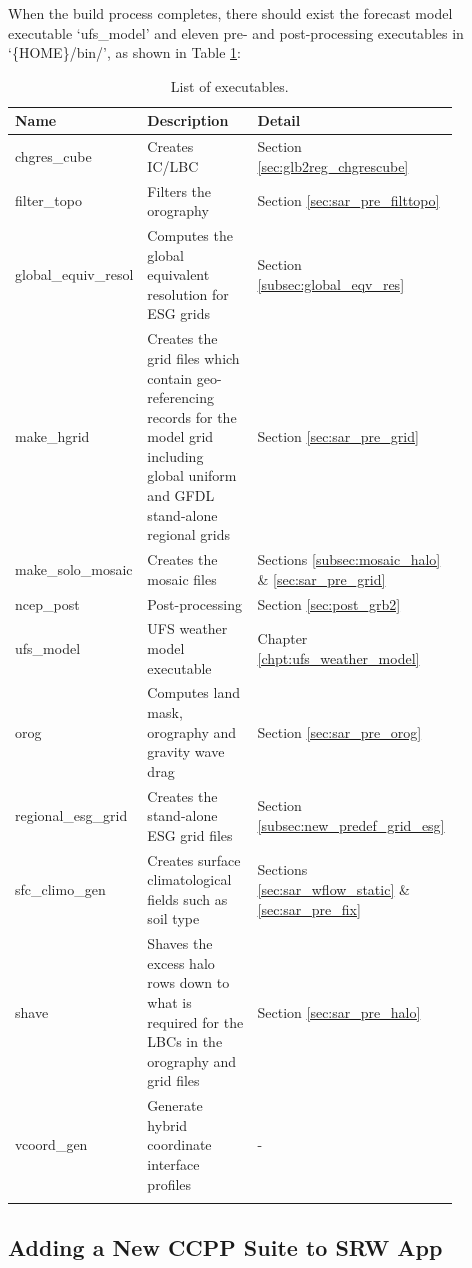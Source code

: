 \documentclass[11pt,fleqn]{report}              %
\begin{document}
When the build process completes, there should exist  the forecast model executable `ufs\_model' and eleven pre- and post-processing executables in `\{HOME\}/bin/', as shown in Table \ref{table:list_exe}:
{
\fontsize{10}{12}\selectfont
\begin{longtable}{ p{0.18\linewidth} | p{0.56\linewidth} | p{0.14\linewidth} }
\hline
\hline
 Name & Description  & Detail \\
\hline
 chgres\_cube & Creates IC/LBC & Section \ref{sec:glb2reg_chgrescube} \\
 filter\_topo & Filters the orography & Section \ref{sec:sar_pre_filttopo} \\
 global\_equiv\_resol & Computes the global equivalent resolution for ESG grids & Section \ref{subsec:global_eqv_res} \\
 make\_hgrid & Creates the grid files which contain geo-referencing records for the model grid including global uniform and GFDL stand-alone regional grids & Section \ref{sec:sar_pre_grid}\\
 make\_solo\_mosaic & Creates the mosaic files & Sections \ref{subsec:mosaic_halo} \& \ref{sec:sar_pre_grid} \\
 ncep\_post & Post-processing & Section \ref{sec:post_grb2} \\
 ufs\_model & UFS weather model executable & Chapter \ref{chpt:ufs_weather_model} \\
 orog & Computes land mask, orography and gravity wave drag  & Section \ref{sec:sar_pre_orog} \\
 regional\_esg\_grid &Creates the stand-alone ESG grid files & Section \ref{subsec:new_predef_grid_esg} \\
 sfc\_climo\_gen & Creates surface climatological fields such as soil type & Sections \ref{sec:sar_wflow_static} \& \ref{sec:sar_pre_fix} \\
 shave & Shaves the excess halo rows down to what is required for the LBCs in the orography and grid files & Section \ref{sec:sar_pre_halo} \\
 vcoord\_gen & Generate hybrid coordinate interface profiles & - \\
\hline
\hline
\caption{List of executables.}
\label{table:list_exe}
\end{longtable}
}


\subsection{Adding a New CCPP Suite to SRW App}
\label{sec:add_ccpp}
\end{document}
